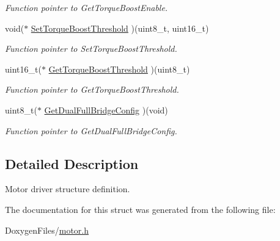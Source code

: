 \begin{DoxyCompactItemize}
\begin{DoxyCompactList}\small\item\em Function pointer to Get\+Torque\+Boost\+Enable. \end{DoxyCompactList}\item 
\mbox{\label{structmotor_drv__t_aa1e7cb5f273fd9ac2dae24da3c257022}} 
void($\ast$ \mbox{\hyperlink{structmotor_drv__t_aa1e7cb5f273fd9ac2dae24da3c257022}{Set\+Torque\+Boost\+Threshold}} )(uint8\+\_\+t, uint16\+\_\+t)
\begin{DoxyCompactList}\small\item\em Function pointer to Set\+Torque\+Boost\+Threshold. \end{DoxyCompactList}\item 
\mbox{\label{structmotor_drv__t_aa0c1dc8598aeca521379a45a0eb94c80}} 
uint16\+\_\+t($\ast$ \mbox{\hyperlink{structmotor_drv__t_aa0c1dc8598aeca521379a45a0eb94c80}{Get\+Torque\+Boost\+Threshold}} )(uint8\+\_\+t)
\begin{DoxyCompactList}\small\item\em Function pointer to Get\+Torque\+Boost\+Threshold. \end{DoxyCompactList}\item 
\mbox{\label{structmotor_drv__t_a0fa32cea306f5637adeb8fe665a52f1e}} 
uint8\+\_\+t($\ast$ \mbox{\hyperlink{structmotor_drv__t_a0fa32cea306f5637adeb8fe665a52f1e}{Get\+Dual\+Full\+Bridge\+Config}} )(void)
\begin{DoxyCompactList}\small\item\em Function pointer to Get\+Dual\+Full\+Bridge\+Config. \end{DoxyCompactList}\end{DoxyCompactItemize}


\subsection{Detailed Description}
Motor driver structure definition. 

The documentation for this struct was generated from the following file\+:\begin{DoxyCompactItemize}
\item 
Doxygen\+Files/\mbox{\hyperlink{motor_8h}{motor.\+h}}\end{DoxyCompactItemize}
